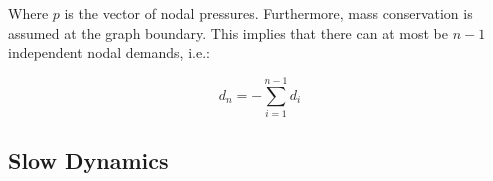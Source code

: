 Where $p$ is the vector of nodal pressures. Furthermore, mass conservation is assumed at the graph boundary. This implies that there can at most be $n-1$ independent nodal demands, i.e.:

\begin{equation}\label{eq:MassConservation}
	d_n = -\sum_{i=1}^{n-1}d_i
\end{equation}

%
%	
%	
%
%
%	
%

\subsection{Slow Dynamics}\label{subsec:SlowDynamics}

